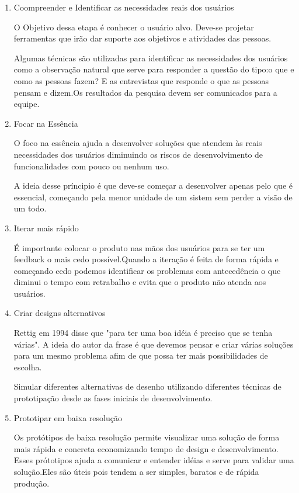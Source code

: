 \begin{enumerate}

\item Coompreender e Identificar as necessidades reais dos usuários

	O Objetivo dessa etapa é conhecer o usuário alvo. Deve-se projetar ferramentas que irão dar suporte aos objetivos e atividades das pessoas.

	Algumas técnicas são utilizadas para identificar as necessidades dos usuários como a observação natural que serve para responder a questão do tipo:o que e como as pessoas fazem? E as entrevistas que responde o que as pessoas pensam e dizem.Os resultados da pesquisa devem ser comunicados para a equipe.

\item Focar na Essência

	 O foco na essência ajuda a desenvolver soluções que atendem às reais necessidades dos usuários diminuindo os riscos de desenvolvimento de funcionalidades com pouco ou nenhum uso.

	A ideia desse príncipio é que deve-se começar a desenvolver apenas pelo que é essencial, começando pela menor unidade de um sistem sem perder a visão de um todo.

\item Iterar mais rápido

	É importante colocar o produto nas mãos dos usuários para se ter um feedback o mais cedo possível.Quando a iteração é feita de forma rápida e começando cedo podemos identificar os problemas com antecedência o que diminui o tempo com retrabalho e evita que o produto não atenda aos usuários.
	

\item Criar designs alternativos

	Rettig em 1994 disse que "para ter uma boa idéia é preciso que se tenha várias". A ideia do autor da frase é que devemos pensar e criar várias soluções para um mesmo problema afim de que possa ter mais possibilidades de escolha. 

	Simular diferentes alternativas de desenho utilizando diferentes técnicas de prototipação desde as fases iniciais de desenvolvimento.

\item Prototipar em baixa resolução

	Os protótipos de baixa resolução permite visualizar uma solução de forma mais rápida e concreta economizando tempo de design e desenvolvimento. Esses prótotipos ajuda a comunicar e entender idéias e serve para validar uma solução.Eles são úteis pois tendem a ser simples, baratos e de rápida produção.


\end{enumerate}
